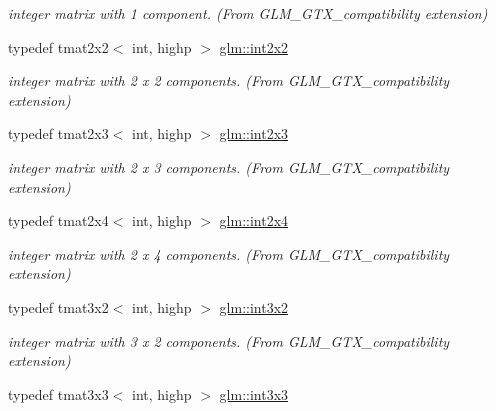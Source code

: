 \begin{DoxyCompactItemize}
\begin{DoxyCompactList}\small\item\em integer matrix with 1 component. (From G\-L\-M\-\_\-\-G\-T\-X\-\_\-compatibility extension) \end{DoxyCompactList}\item 
\hypertarget{group__gtx__compatibility_ga5f407f808d8fa5b771ea7417cedc4868}{typedef tmat2x2$<$ int, highp $>$ \hyperlink{group__gtx__compatibility_ga5f407f808d8fa5b771ea7417cedc4868}{glm\-::int2x2}}\label{group__gtx__compatibility_ga5f407f808d8fa5b771ea7417cedc4868}

\begin{DoxyCompactList}\small\item\em integer matrix with 2 x 2 components. (From G\-L\-M\-\_\-\-G\-T\-X\-\_\-compatibility extension) \end{DoxyCompactList}\item 
\hypertarget{group__gtx__compatibility_ga37b2b18255fa5ff7fa23d8b1d34b8034}{typedef tmat2x3$<$ int, highp $>$ \hyperlink{group__gtx__compatibility_ga37b2b18255fa5ff7fa23d8b1d34b8034}{glm\-::int2x3}}\label{group__gtx__compatibility_ga37b2b18255fa5ff7fa23d8b1d34b8034}

\begin{DoxyCompactList}\small\item\em integer matrix with 2 x 3 components. (From G\-L\-M\-\_\-\-G\-T\-X\-\_\-compatibility extension) \end{DoxyCompactList}\item 
\hypertarget{group__gtx__compatibility_gaa402ce479f756c0805d25fede99251e3}{typedef tmat2x4$<$ int, highp $>$ \hyperlink{group__gtx__compatibility_gaa402ce479f756c0805d25fede99251e3}{glm\-::int2x4}}\label{group__gtx__compatibility_gaa402ce479f756c0805d25fede99251e3}

\begin{DoxyCompactList}\small\item\em integer matrix with 2 x 4 components. (From G\-L\-M\-\_\-\-G\-T\-X\-\_\-compatibility extension) \end{DoxyCompactList}\item 
\hypertarget{group__gtx__compatibility_gac99c78a227d95384611146a64c4d3ce8}{typedef tmat3x2$<$ int, highp $>$ \hyperlink{group__gtx__compatibility_gac99c78a227d95384611146a64c4d3ce8}{glm\-::int3x2}}\label{group__gtx__compatibility_gac99c78a227d95384611146a64c4d3ce8}

\begin{DoxyCompactList}\small\item\em integer matrix with 3 x 2 components. (From G\-L\-M\-\_\-\-G\-T\-X\-\_\-compatibility extension) \end{DoxyCompactList}\item 
\hypertarget{group__gtx__compatibility_ga4eb54b9ea96f12c04faaf2ca7b7c8c70}{typedef tmat3x3$<$ int, highp $>$ \hyperlink{group__gtx__compatibility_ga4eb54b9ea96f12c04faaf2ca7b7c8c70}{glm\-::int3x3}}\label{group__gtx__compatibility_ga4eb54b9ea96f12c04faaf2ca7b7c8c70}


\end{DoxyCompactItemize}
